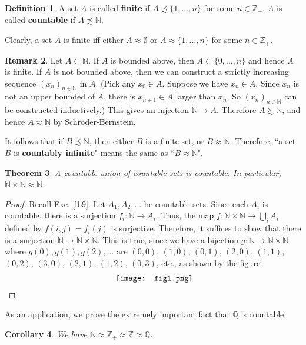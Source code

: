 \documentclass[12pt,b5paper,notitlepage]{article}
\theoremstyle{definition}
\newtheorem{df}{Definition}[section]
\newtheorem{rem}[df]{Remark}
\theoremstyle{plain}
\newtheorem{thm}[df]{Theorem}
\newtheorem{co}[df]{Corollary}
\newcommand{\Nbb}{\mathbb N}
\newcommand{\Zbb}{\mathbb Z}
\newcommand{\Qbb}{\mathbb Q}
\numberwithin{equation}{section}
\begin{document}
\begin{df}
A set $A$ is called \textbf{finite} if $A\precsim\{1,\dots,n\}$ for some $n\in\Zbb_+$. $A$ is called  \textbf{countable} if $A\precsim\Nbb$. 
\end{df}

Clearly, a set $A$ is finite iff either $A\approx\emptyset$ or $A\approx\{1,\dots,n\}$ for some $n\in\Zbb_+$.

\begin{rem}
Let $A\subset\Nbb$. If $A$ is bounded above, then $A\subset\{0,\dots,n\}$ and hence $A$ is finite. If $A$ is not bounded above, then we can construct a strictly increasing sequence $(x_n)_{n\in\Nbb}$ in $A$. (Pick any $x_0\in A$. Suppose we have $x_n\in A$. Since $x_n$ is not an upper bounded of $A$, there is $x_{n+1}\in A$ larger than $x_n$. So $(x_n)_{n\in\Nbb}$ can be constructed inductively.) This gives an injection $\Nbb\rightarrow A$. Therefore $A\succsim \Nbb$, and hence $A\approx \Nbb$ by Schr\"oder-Bernstein.

It follows that if $B\precsim\Nbb$, then either $B$ is a finite set, or $B\approx\Nbb$. Therefore, ``a set $B$ is \textbf{countably infinite}"  means the same as ``$B\approx\Nbb$".  \hfill\qedsymbol 
\end{rem}


\begin{thm}\label{lb15}
A countable union of countable sets is countable. In particular, $\Nbb\times\Nbb\approx\Nbb$.
\end{thm}

\begin{proof}
Recall Exe. \ref{lb9}. Let $A_1,A_2,\dots$ be countable sets. Since each $A_i$ is countable, there is a surjection $f_i:\Nbb\rightarrow A_i$. Thus, the map $f:\Nbb\times\Nbb\rightarrow \bigcup_i A_i$ defined by $f(i,j)=f_i(j)$ is surjective. Therefore, it suffices to show that there is a surjection $\Nbb\rightarrow\Nbb\times\Nbb$. This is true, since we have a bijection $g:\Nbb\rightarrow\Nbb\times\Nbb$ where $g(0),g(1),g(2),\dots$ are $(0,0)$, $(1,0)$, $(0,1)$, $(2,0)$, $(1,1)$, $(0,2)$, $(3,0)$, $(2,1)$, $(1,2)$, $(0,3)$, etc., as shown by the figure
\begin{align*}
\vcenter{\hbox{{
			\texttt{[image: fig1.png]}}}}
\end{align*}
\end{proof}

As an application, we prove the extremely important fact that $\Qbb$ is countable.
\begin{co}
We have $\Nbb\approx\Zbb_+\approx\Zbb\approx \Qbb$.
\end{co}
\end{document}
